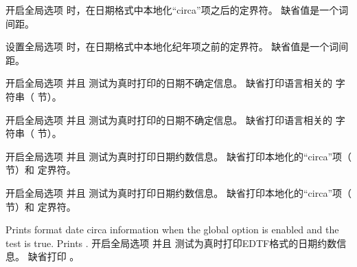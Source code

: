 \begin{ltxsyntax}
\CSdelimMark
开启全局选项  时，在日期格式中本地化“circa”项之后的定界符。
缺省值是一个词间距。

\CSdelimMark
设置全局选项  时，在日期格式中本地化纪年项之前的定界符。
缺省值是一个词间距。

开启全局选项  并且  测试为真时打印的日期不确定信息。
缺省打印语言相关的  字符串（ 节）。

开启全局选项  并且  测试为真时打印的日期不确定信息。
缺省打印语言相关的  字符串（ 节）。

开启全局选项  并且  测试为真时打印日期约数信息。
缺省打印本地化的“circa”项（ 节）和  定界符。

开启全局选项  并且  测试为真时打印日期约数信息。
缺省打印本地化的“circa”项（ 节）和  定界符。

Prints  format date circa information when the global option  is enabled and the  test is true. Prints .
开启全局选项  并且  测试为真时打印EDTF格式的日期约数信息。
缺省打印 。


\end{ltxsyntax}
